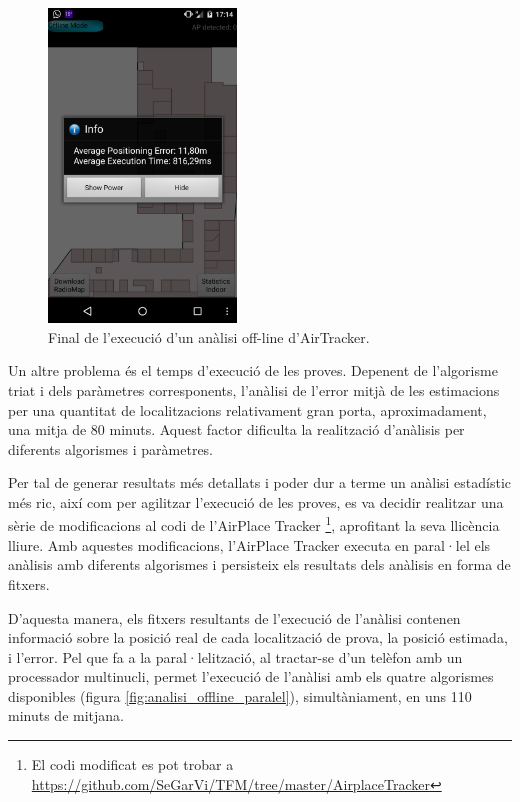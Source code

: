\begin{figure}[ht]
\begin{center}
\includegraphics[width=5cm]{imatges/analisi_offline_defecte.png}
\caption{Final de l'execució d'un anàlisi off-line d'AirTracker.}
\label{fig:analisi_offline_defecte}
\end{center}
\end{figure}

Un altre problema és el temps d'execució de les proves. Depenent de l'algorisme triat i dels paràmetres corresponents, l'anàlisi de l'error mitjà de les estimacions per una quantitat de localitzacions relativament gran porta, aproximadament, una mitja de 80 minuts. Aquest factor dificulta la realització d'anàlisis per diferents algorismes i paràmetres.

Per tal de generar resultats més detallats i poder dur a terme un anàlisi estadístic més ric, així com per agilitzar l'execució de les proves, es va decidir realitzar una sèrie de modificacions al codi de l'AirPlace Tracker \footnote{El codi modificat es pot trobar a \url{https://github.com/SeGarVi/TFM/tree/master/AirplaceTracker}}, aprofitant la seva llicència lliure. Amb aquestes modificacions, l'AirPlace Tracker executa en paral·lel els anàlisis amb diferents algorismes i persisteix els resultats dels anàlisis en forma de fitxers.

D'aquesta manera, els fitxers resultants de l'execució de l'anàlisi contenen informació sobre la posició real de cada localització de prova, la posició estimada, i l'error. Pel que fa a la paral·lelització, al tractar-se d'un telèfon amb un processador multinucli, permet l'execució de l'anàlisi amb els quatre algorismes disponibles (figura \ref{fig:analisi_offline_paralel}), simultàniament, en uns 110 minuts de mitjana.

